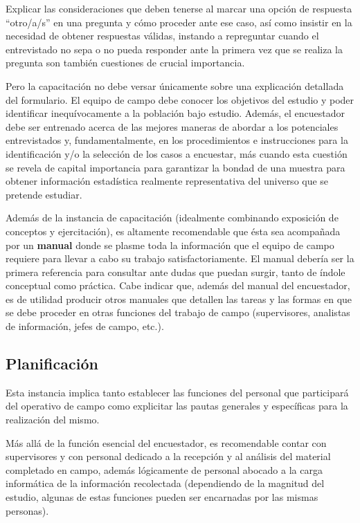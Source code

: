 \documentclass[
]{book}
\begin{document}
Explicar las consideraciones que deben tenerse al marcar una opción de respuesta ``otro/a/s'' en una pregunta y cómo proceder ante ese caso, así como insistir en la necesidad de obtener respuestas válidas, instando a repreguntar cuando el entrevistado no sepa o no pueda responder ante la primera vez que se realiza la pregunta son también cuestiones de crucial importancia.

\hfill\break
Pero la capacitación no debe versar únicamente sobre una explicación detallada del formulario. El equipo de campo debe conocer los objetivos del estudio y poder identificar inequívocamente a la población bajo estudio. Además, el encuestador debe ser entrenado acerca de las mejores maneras de abordar a los potenciales entrevistados y, fundamentalmente, en los procedimientos e instrucciones para la identificación y/o la selección de los casos a encuestar, más cuando esta cuestión se revela de capital importancia para garantizar la bondad de una muestra para obtener información estadística realmente representativa del universo que se pretende estudiar.

Además de la instancia de capacitación (idealmente combinando exposición de conceptos y ejercitación), es altamente recomendable que ésta sea acompañada por un \textbf{manual} donde se plasme toda la información que el equipo de campo requiere para llevar a cabo su trabajo satisfactoriamente. El manual debería ser la primera referencia para consultar ante dudas que puedan surgir, tanto de índole conceptual como práctica. Cabe indicar que, además del manual del encuestador, es de utilidad producir otros manuales que detallen las tareas y las formas en que se debe proceder en otras funciones del trabajo de campo (supervisores, analistas de información, jefes de campo, etc.).

\hypertarget{planificaciuxf3n}{%
\subsection{Planificación}\label{planificaciuxf3n}}

Esta instancia implica tanto establecer las funciones del personal que participará del operativo de campo como explicitar las pautas generales y específicas para la realización del mismo.

Más allá de la función esencial del encuestador, es recomendable contar con supervisores y con personal dedicado a la recepción y al análisis del material completado en campo, además lógicamente de personal abocado a la carga informática de la información recolectada (dependiendo de la magnitud del estudio, algunas de estas funciones pueden ser encarnadas por las mismas personas).
\end{document}
